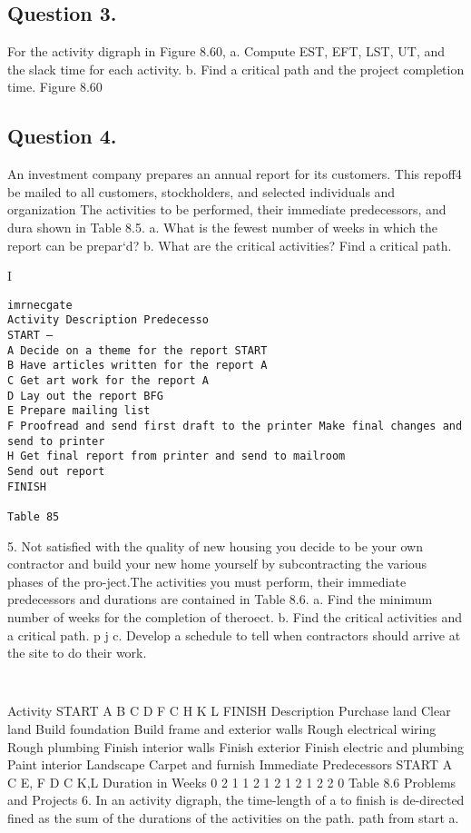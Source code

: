 \documentclass{article}
\begin{document}
\subsection{Question 3.} For the activity digraph in Figure 8.60, a. Compute EST, EFT, LST, UT, and the slack time for each activity. b. Find a critical path and the project completion time. 
Figure 8.60 

\subsection{Question 4.}  An investment company prepares an annual report for its customers. This repoff4 be mailed to all customers, stockholders, and selected individuals and organization The activities to be performed, their immediate predecessors, and dura shown in Table 8.5. a. What is the fewest number of weeks in which the report can be prepar‘d? b. What are the critical activities? Find a critical path. 

I 
\begin{verbatim}
imrnecgate 
Activity Description Predecesso 
START — 
A Decide on a theme for the report START 
B Have articles written for the report A 
C Get art work for the report A 
D Lay out the report BFG 
E Prepare mailing list 
F Proofread and send first draft to the printer Make final changes and send to printer 
H Get final report from printer and send to mailroom 
Send out report 
FINISH 

Table 85 
\end{verbatim}


5. Not satisfied with the quality of new housing you decide to be your own contractor and build your new home yourself by subcontracting the various phases of the pro-ject.The activities you must perform, their immediate predecessors and durations are contained in Table 8.6. a. Find the minimum number of weeks for the completion of theroect. b. Find the critical activities and a critical path. p j c. Develop a schedule to tell when contractors should arrive at the site to do their work. 
\begin{verbatim}
    
\end{verbatim}
Activity START A B C D F C H K L FINISH Description Purchase land 
Clear land 
Build foundation 
Build frame and exterior walls 
Rough electrical wiring 
Rough plumbing 
Finish interior walls 
Finish exterior 
Finish electric and plumbing 
Paint interior Landscape Carpet and furnish 
Immediate Predecessors START A C E, F D C K,L 
Duration in Weeks 0 2 1 1 2 1 2 1 2 1 2 2 0 
Table 8.6 
Problems and Projects 6. In an activity digraph, the time-length of a to finish is de-directed fined as the sum of the durations of the activities on the path. path from start a. 
\end{document}
